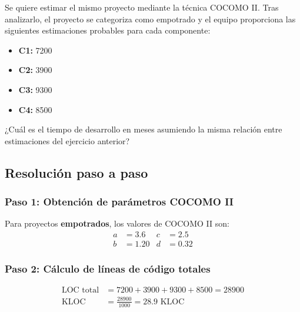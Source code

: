 

\begin{enunciado}
    Se quiere estimar el mismo proyecto mediante la técnica COCOMO II. Tras analizarlo, el proyecto se categoriza como empotrado y el equipo proporciona las siguientes estimaciones probables para cada componente:

    \begin{itemize}[leftmargin=*]
        \item \textbf{C1:} \qty{7200}{\linesofcode}
        \item \textbf{C2:} \qty{3900}{\linesofcode}
        \item \textbf{C3:} \qty{9300}{\linesofcode}
        \item \textbf{C4:} \qty{8500}{\linesofcode}
    \end{itemize}

    ¿Cuál es el tiempo de desarrollo en meses asumiendo la misma relación entre estimaciones del ejercicio anterior?
\end{enunciado}

\subsection{Resolución paso a paso}\label{subsec:resolucion-paso-a-paso}

\subsubsection{Paso 1: Obtención de parámetros COCOMO II}

\begin{importante}
    Para proyectos \textbf{empotrados}, los valores de COCOMO II son:
    \begin{align*}
        a &= 3.6 & c &= 2.5\\
        b &= 1.20 & d &= 0.32
    \end{align*}
\end{importante}

\subsubsection{Paso 2: Cálculo de líneas de código totales}
\begin{align}
    \text{LOC total} &= 7200 + 3900 + 9300 + 8500 = 28900\\
    \text{KLOC} &= \frac{28900}{1000} = \boxed{28.9 \text{ KLOC}}
\end{align}

